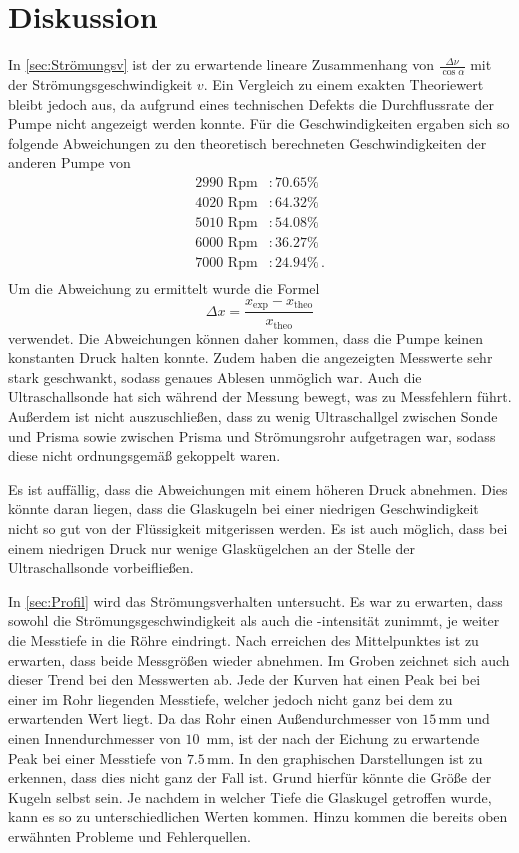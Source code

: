 \section{Diskussion}
\label{sec:Diskussion}

In \autoref{sec:Strömungsv} ist der zu erwartende lineare Zusammenhang von $\frac{\Delta \nu}{\cos \alpha}$ mit der Strömungsgeschwindigkeit $v$. Ein Vergleich zu einem exakten Theoriewert bleibt jedoch aus, 
da aufgrund eines technischen Defekts die Durchflussrate der Pumpe nicht angezeigt werden konnte. Für die Geschwindigkeiten ergaben sich so folgende Abweichungen zu den theoretisch berechneten 
Geschwindigkeiten der anderen Pumpe von
\begin{align*}
    2990 \text{ Rpm}&:70.65\%\\
    4020 \text{ Rpm}&:64.32\%\\
    5010 \text{ Rpm}&:54.08\%\\
    6000 \text{ Rpm}&:36.27\%\\
    7000 \text{ Rpm}&:24.94\%\, .\\
\end{align*}
Um die Abweichung zu ermittelt wurde die Formel
\begin{equation*}
    \Delta x=\frac{x_{\text{exp}}-x_{\text{theo}}}{x_{\text{theo}}}
\end{equation*}
verwendet.
Die Abweichungen können daher kommen, dass die Pumpe keinen konstanten Druck halten konnte. Zudem haben die angezeigten Messwerte sehr stark geschwankt,
sodass genaues Ablesen unmöglich war. Auch die Ultraschallsonde hat sich während der Messung bewegt, was zu Messfehlern führt. Außerdem ist nicht 
auszuschließen, dass zu wenig Ultraschallgel zwischen Sonde und Prisma sowie zwischen Prisma und Strömungsrohr aufgetragen war, sodass diese nicht ordnungsgemäß gekoppelt
waren. 

Es ist auffällig, dass die Abweichungen mit einem höheren Druck abnehmen. Dies könnte daran liegen, dass die Glaskugeln bei einer niedrigen Geschwindigkeit
nicht so gut von der Flüssigkeit mitgerissen werden. Es ist auch möglich, dass bei einem niedrigen Druck nur wenige Glaskügelchen an der Stelle der 
Ultraschallsonde vorbeifließen.

In \autoref{sec:Profil} wird das Strömungsverhalten untersucht. Es war zu erwarten, dass sowohl die Strömungsgeschwindigkeit als auch die -intensität zunimmt, je weiter die Messtiefe in die Röhre eindringt.
Nach erreichen des Mittelpunktes ist zu erwarten, dass beide Messgrößen wieder abnehmen. Im Groben zeichnet sich auch dieser Trend bei den Messwerten ab. Jede der Kurven hat einen Peak bei bei einer im Rohr liegenden Messtiefe, welcher jedoch nicht ganz bei dem zu erwartenden Wert liegt.
Da das Rohr einen Außendurchmesser von $15\,$mm und einen Innendurchmesser von $10\,$ mm, ist der nach der Eichung zu erwartende Peak bei einer Messtiefe von $7.5\,$mm.
In den graphischen Darstellungen ist zu erkennen, dass dies nicht ganz der Fall ist. Grund hierfür könnte die Größe der Kugeln selbst sein. Je nachdem in welcher Tiefe die Glaskugel getroffen wurde, kann es so zu unterschiedlichen Werten kommen. 
Hinzu kommen die bereits oben erwähnten Probleme und Fehlerquellen.
